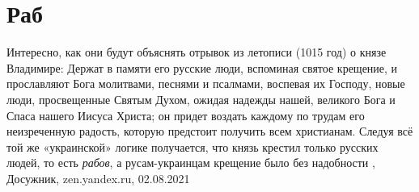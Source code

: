  
 
 
 
 
\chapter{Раб}

Интересно, как они будут объяснять отрывок из летописи (1015 год) о князе
Владимире: Держат в памяти его русские люди, вспоминая святое крещение, и
прославляют Бога молитвами, песнями и псалмами, воспевая их Господу, новые
люди, просвещенные Святым Духом, ожидая надежды нашей, великого Бога и Спаса
нашего Иисуса Христа; он придет воздать каждому по трудам его неизреченную
радость, которую предстоит получить всем христианам.  Следуя всё той же
«украинской» логике получается, что князь крестил только русских людей, то есть
\emph{рабов}, а русам-украинцам крещение было без надобности
, Досужник, zen.yandex.ru, 02.08.2021
